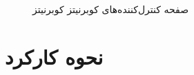 {    \begin{figure}[H]
        \caption{صفحه کنترل‌کننده‌های کوبرنیتز کوبرنیتز}
        \label{fig:dash_controllers}
    \end{figure}
}


\section{نحوه کارکرد}
